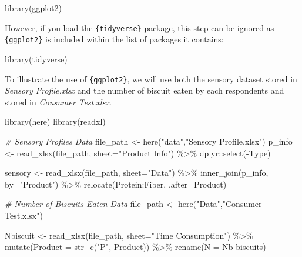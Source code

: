 \documentclass[
]{book}
\newenvironment{Shaded}{\begin{snugshade}}{\end{snugshade}}
\newcommand{\AttributeTok}[1]{\textcolor[rgb]{0.77,0.63,0.00}{#1}}
\newcommand{\CommentTok}[1]{\textcolor[rgb]{0.56,0.35,0.01}{\textit{#1}}}
\newcommand{\FunctionTok}[1]{\textcolor[rgb]{0.00,0.00,0.00}{#1}}
\newcommand{\NormalTok}[1]{#1}
\newcommand{\OtherTok}[1]{\textcolor[rgb]{0.56,0.35,0.01}{#1}}
\newcommand{\SpecialCharTok}[1]{\textcolor[rgb]{0.00,0.00,0.00}{#1}}
\newcommand{\StringTok}[1]{\textcolor[rgb]{0.31,0.60,0.02}{#1}}
\begin{document}
\begin{Shaded}
\begin{Highlighting}[]
\FunctionTok{library}\NormalTok{(ggplot2)}
\end{Highlighting}
\end{Shaded}

However, if you load the \texttt{\{tidyverse\}} package, this step can be ignored as \texttt{\{ggplot2\}} is included within the list of packages it contains:

\begin{Shaded}
\begin{Highlighting}[]
\FunctionTok{library}\NormalTok{(tidyverse)}
\end{Highlighting}
\end{Shaded}

To illustrate the use of \texttt{\{ggplot2\}}, we will use both the sensory dataset stored in \emph{Sensory Profile.xlsx} and the number of biscuit eaten by each respondents and stored in \emph{Consumer Test.xlsx}.

\begin{Shaded}
\begin{Highlighting}[]
\FunctionTok{library}\NormalTok{(here)}
\FunctionTok{library}\NormalTok{(readxl)}

\CommentTok{\# Sensory Profiles Data}
\NormalTok{file\_path }\OtherTok{\textless{}{-}} \FunctionTok{here}\NormalTok{(}\StringTok{"data"}\NormalTok{,}\StringTok{"Sensory Profile.xlsx"}\NormalTok{) }
\NormalTok{p\_info }\OtherTok{\textless{}{-}} \FunctionTok{read\_xlsx}\NormalTok{(file\_path, }\AttributeTok{sheet=}\StringTok{"Product Info"}\NormalTok{) }\SpecialCharTok{\%\textgreater{}\%} 
\NormalTok{  dplyr}\SpecialCharTok{::}\FunctionTok{select}\NormalTok{(}\SpecialCharTok{{-}}\NormalTok{Type)}

\NormalTok{sensory }\OtherTok{\textless{}{-}} \FunctionTok{read\_xlsx}\NormalTok{(file\_path, }\AttributeTok{sheet=}\StringTok{"Data"}\NormalTok{) }\SpecialCharTok{\%\textgreater{}\%} 
  \FunctionTok{inner\_join}\NormalTok{(p\_info, }\AttributeTok{by=}\StringTok{"Product"}\NormalTok{) }\SpecialCharTok{\%\textgreater{}\%} 
  \FunctionTok{relocate}\NormalTok{(Protein}\SpecialCharTok{:}\NormalTok{Fiber, }\AttributeTok{.after=}\NormalTok{Product)}

\CommentTok{\# Number of Biscuits Eaten Data}
\NormalTok{file\_path }\OtherTok{\textless{}{-}} \FunctionTok{here}\NormalTok{(}\StringTok{"Data"}\NormalTok{,}\StringTok{"Consumer Test.xlsx"}\NormalTok{)}

\NormalTok{Nbiscuit }\OtherTok{\textless{}{-}} \FunctionTok{read\_xlsx}\NormalTok{(file\_path, }\AttributeTok{sheet=}\StringTok{"Time Consumption"}\NormalTok{) }\SpecialCharTok{\%\textgreater{}\%} 
  \FunctionTok{mutate}\NormalTok{(}\AttributeTok{Product =} \FunctionTok{str\_c}\NormalTok{(}\StringTok{"P"}\NormalTok{, Product)) }\SpecialCharTok{\%\textgreater{}\%} 
  \FunctionTok{rename}\NormalTok{(}\AttributeTok{N =} \StringTok{\textasciigrave{}}\AttributeTok{Nb biscuits}\StringTok{\textasciigrave{}}\NormalTok{)}
\end{Highlighting}
\end{Shaded}
\end{document}
